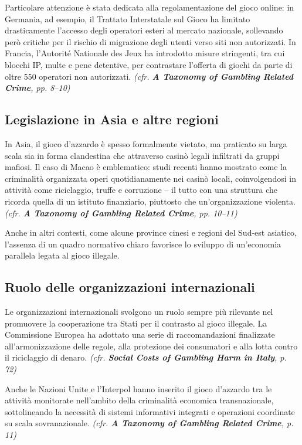 \documentclass[a4paper,12pt]{article}
\begin{document}
Particolare attenzione è stata dedicata alla regolamentazione del gioco online: in Germania, ad esempio, il Trattato Interstatale sul Gioco ha limitato drasticamente l’accesso degli operatori esteri al mercato nazionale, sollevando però critiche per il rischio di migrazione degli utenti verso siti non autorizzati. In Francia, l’Autorité Nationale des Jeux ha introdotto misure stringenti, tra cui blocchi IP, multe e pene detentive, per contrastare l’offerta di giochi da parte di oltre 550 operatori non autorizzati. \textit{(cfr. \textbf{A Taxonomy of Gambling Related Crime}, pp. 8--10)} \cite{banks2018taxonomy}

\subsection{Legislazione in Asia e altre regioni}

In Asia, il gioco d’azzardo è spesso formalmente vietato, ma praticato su larga scala sia in forma clandestina che attraverso casinò legali infiltrati da gruppi mafiosi. Il caso di Macao è emblematico: studi recenti hanno mostrato come la criminalità organizzata operi quotidianamente nei casinò locali, coinvolgendosi in attività come riciclaggio, truffe e corruzione – il tutto con una struttura che ricorda quella di un istituto finanziario, piuttosto che un’organizzazione violenta. \textit{(cfr. \textbf{A Taxonomy of Gambling Related Crime}, pp. 10--11)} \cite{banks2018taxonomy}

Anche in altri contesti, come alcune province cinesi e regioni del Sud-est asiatico, l’assenza di un quadro normativo chiaro favorisce lo sviluppo di un’economia parallela legata al gioco illegale.

\subsection{Ruolo delle organizzazioni internazionali}

Le organizzazioni internazionali svolgono un ruolo sempre più rilevante nel promuovere la cooperazione tra Stati per il contrasto al gioco illegale. La Commissione Europea ha adottato una serie di raccomandazioni finalizzate all’armonizzazione delle regole, alla protezione dei consumatori e alla lotta contro il riciclaggio di denaro. \textit{(cfr. \textbf{Social Costs of Gambling Harm in Italy}, p. 72)} \cite{lucchini2022socialcosts}

Anche le Nazioni Unite e l’Interpol hanno inserito il gioco d’azzardo tra le attività monitorate nell’ambito della criminalità economica transnazionale, sottolineando la necessità di sistemi informativi integrati e operazioni coordinate su scala sovranazionale. \textit{(cfr. \textbf{A Taxonomy of Gambling Related Crime}, p. 11)} \cite{banks2018taxonomy}
\end{document}

